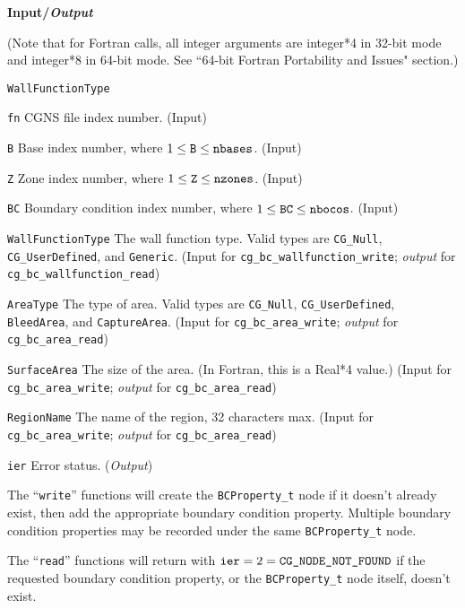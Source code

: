 \noindent
\textbf{\textcolor{input}{Input}/\textcolor{output}{\textit{Output}}}

\noindent (Note that for Fortran calls, all integer arguments are integer*4 in 32-bit mode and integer*8 in 64-bit mode.
See ``64-bit Fortran Portability and Issues" section.)

\begin{Ventryi}{\texttt{WallFunctionType}}\raggedright
\item [\texttt{fn}]
      CGNS file index number.
      (\textcolor{input}{Input})
\item [\texttt{B}]
      Base index number, where $1 \leq \text{\texttt{B}} \leq \text{\texttt{nbases}}$.
      (\textcolor{input}{Input})
\item [\texttt{Z}]
      Zone index number, where $1 \leq \text{\texttt{Z}} \leq \text{\texttt{nzones}}$.
      (\textcolor{input}{Input})
\item [\texttt{BC}]
      Boundary condition index number, where $1 \leq \text{\texttt{BC}} \leq \text{\texttt{nbocos}}$.
      (\textcolor{input}{Input})
\item [\texttt{WallFunctionType}]
      The wall function type.
      Valid types are \texttt{CG\_Null}, \texttt{CG\_UserDefined}, and \texttt{Generic}.
      (\textcolor{input}{Input} for \texttt{cg\_bc\_wallfunction\_write};
      \textcolor{output}{\textit{output}} for
      \texttt{cg\_bc\_wallfunction\_read})
\item [\texttt{AreaType}]
      The type of area.
      Valid types are \texttt{CG\_Null}, \texttt{CG\_UserDefined}, \texttt{BleedArea},
      and \texttt{CaptureArea}.
      (\textcolor{input}{Input} for \texttt{cg\_bc\_area\_write};
      \textcolor{output}{\textit{output}} for \texttt{cg\_bc\_area\_read})
\item [\texttt{SurfaceArea}]
      The size of the area. (In Fortran, this is a Real*4 value.)
      (\textcolor{input}{Input} for \texttt{cg\_bc\_area\_write};
      \textcolor{output}{\textit{output}} for \texttt{cg\_bc\_area\_read})
\item [\texttt{RegionName}]
      The name of the region, 32 characters max.
      (\textcolor{input}{Input} for \texttt{cg\_bc\_area\_write};
      \textcolor{output}{\textit{output}} for \texttt{cg\_bc\_area\_read})
\item [\texttt{ier}]
      Error status.
      (\textcolor{output}{\textit{Output}})
\end{Ventryi}

The ``\texttt{write}'' functions will create the \texttt{BCProperty\_t}
node if it doesn't already exist, then add the appropriate boundary
condition property.
Multiple boundary condition properties may be recorded under the same
\texttt{BCProperty\_t} node.

The ``\texttt{read}'' functions will return with $\text{\texttt{ier}} = 2 =
\text{\texttt{CG\_NODE\_NOT\_FOUND}}$ if the requested boundary condition
property, or the \texttt{BCProperty\_t} node itself, doesn't exist.
